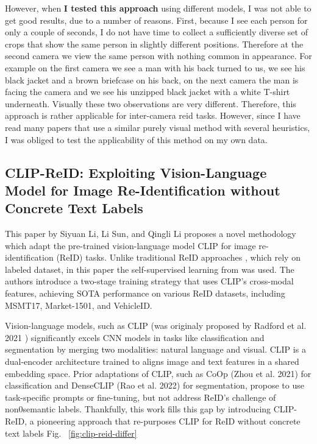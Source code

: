 \documentclass[12pt, a4paper]{article}
\begin{document}
However, when \textbf{I tested this approach} using different models, I was not able to get good results, due to a number of reasons. First, because I see each person for only a couple of seconds, I do not have time to collect a sufficiently diverse set of crops that show the same person in slightly different positions. Therefore at the second camera we view the same person with nothing common in appearance. For example on the first camera we see a man with his back turned to us, we see his black jacket and a brown briefcase on his back, on the next camera the man is facing the camera and we see his unzipped black jacket with a white T-shirt underneath. Visually these two observations are very different. Therefore, this approach is rather applicable for inter-camera reid tasks. However, since I have read many papers that use a similar purely visual method with several heuristics, I was obliged to test the applicability of this method on my own data.


\subsection{CLIP-ReID: Exploiting Vision-Language Model for Image Re-Identification without Concrete Text Labels \cite{clip-reid}}

This paper by Siyuan Li, Li Sun, and Qingli Li proposes a novel methodology which adapt the pre-trained vision-language model CLIP for image re-identification (ReID) tasks. Unlike traditional ReID approaches \cite{reid-object-segmentaion, reid_survey}, which rely on labeled dataset, in this paper the self-supervised learning from \cite{ACAN} was used. The authors introduce a two-stage training strategy that uses CLIP’s cross-modal features, achieving SOTA performance on various ReID datasets, including MSMT17, Market-1501, and VehicleID.

Vision-language models, such as CLIP (was originaly proposed by Radford et al. 2021 \cite{CLIP}) significantly excels CNN models in tasks like classification and segmentation by merging two modalities: natural language and visual. CLIP is a dual-encoder architecture trained to aligns image and text features in a shared embedding space. Prior adaptations of CLIP, such as CoOp (Zhou et al. 2021) \cite{CoOp-clip} for classification and DenseCLIP (Rao et al. 2022) \cite{dense-clip} for segmentation, propose to use task-specific prompts or fine-tuning, but not address ReID's challenge of non0semantic labels. Thankfully, this work \cite{clip-reid} fills this gap by introducing CLIP-ReID, a pioneering approach that re-purposes CLIP for ReID without concrete text labels Fig. ~\ref{fig:clip-reid-differ}
\end{document}
